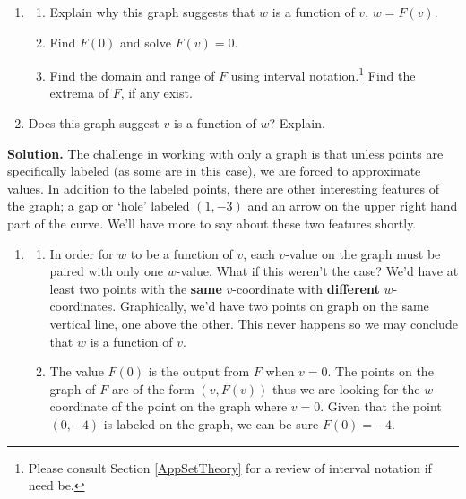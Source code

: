 \documentclass{ximera}
\begin{document}
\begin{example}
\begin{enumerate}

\item \begin{enumerate} 

\item Explain why this graph suggests that $w$ is a function of $v$, $w = F(v)$.

\item  Find  $F(0)$ and solve $F(v) = 0$.

\item  Find the domain and range of $F$ using interval notation.\footnote{Please consult  Section \ref{AppSetTheory} for a review of interval notation if need be.}   Find the extrema of $F$, if any exist.

\end{enumerate}

\item  Does this graph suggest $v$ is a function of $w$?  Explain.

\end{enumerate}

{\bf Solution.}  The challenge in working with only a graph is that unless points are specifically labeled (as some are in this case), we are forced to approximate values. In addition to the labeled points, there are other interesting features of the graph;  a gap or `hole' labeled $(1,-3)$ and an arrow on the upper right hand part of the curve.  We'll have more to say about these two features shortly.  


 \begin{enumerate}

\item  \begin{enumerate}

\item In order for $w$ to be a function of $v$, each $v$-value on the graph must be paired with  only one $w$-value.  What if this weren't the case?  We'd have at least two points with the \textbf{same} $v$-coordinate with \textbf{different} $w$-coordinates.  Graphically, we'd have two points on graph on the same vertical line, one above the other.  This never happens so we may conclude that $w$ is a function of $v$.

\item The value $F(0)$ is the output from $F$ when  $v = 0$.  The points on the graph of $F$ are of the form $(v, F(v))$ thus we are looking for the $w$-coordinate of the point on the graph where $v = 0$.  Given that the point $(0,-4)$  is labeled on the graph, we can be sure $F(0) = -4$.  


\end{enumerate}
\end{enumerate}
\end{example}
\end{document}
